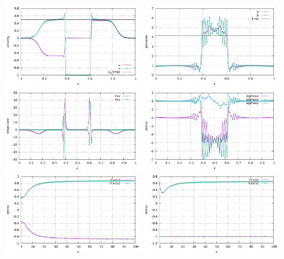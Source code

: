 \begin{center}
\includegraphics[width=6cm]{python_codes/fieldstone_08/results/rough/velocity.pdf}
\includegraphics[width=6cm]{python_codes/fieldstone_08/results/rough/pressure.pdf}\\
\includegraphics[width=6cm]{python_codes/fieldstone_08/results/rough/strainrate.pdf}
\includegraphics[width=6cm]{python_codes/fieldstone_08/results/rough/stress.pdf}\\
\includegraphics[width=6cm]{python_codes/fieldstone_08/results/rough/u_stats.pdf}
\includegraphics[width=6cm]{python_codes/fieldstone_08/results/rough/v_stats.pdf}\\

\end{center}
